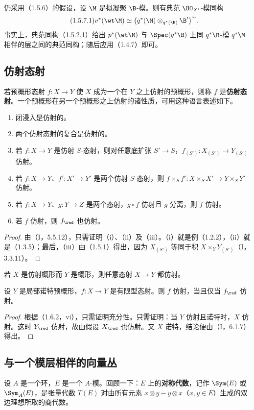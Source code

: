 仍采用（1.5.6）的假设，设 $\M$ 是拟凝聚 $\B$-模。则有典范 $\OO_{X'}$-模同构
\begin{equation}\tag{1.5.7.1}
v^*(\wt\M)\simeq\bigl(q^*(\M)\otimes_{q^*(\B)}\B'\bigr)^\sim.
\end{equation}
事实上，典范同构（1.5.2.1）给出 $p^*(\wt\M)$ 与 $\Spec(q^*\B)$ 上同 $q^*\B$-模 $q^*\M$ 相伴的层之间的典范同构；随后应用（1.4.7）即可。

\subsection{仿射态射}
若预概形态射 $f:X\to Y$ 使 $X$ 成为一个在 $Y$ 之上仿射的预概形，则称 $f$ 是\textbf{仿射态射}。一个预概形在另一个预概形之上仿射的诸性质，可用这种语言表述如下。

\begin{enumerate}[label=(\roman*)]
\item 闭浸入是仿射的。
\item 两个仿射态射的复合是仿射的。
\item 若 $f:X\to Y$ 是仿射 $S$-态射，则对任意底扩张 $S'\to S$，$f_{(S')}:X_{(S')}\to Y_{(S')}$ 仿射。
\item 若 $f:X\to Y$、$f':X'\to Y'$ 是两个仿射 $S$-态射，则
$f\times_Sf':X\times_SX'\to Y\times_SY'$ 仿射。
\item 若 $f:X\to Y$、$g:Y\to Z$ 是两个态射，$g\circ f$ 仿射且 $g$ 分离，则 $f$ 仿射。
\item 若 $f$ 仿射，则 $f_{\red}$ 也仿射。
\end{enumerate}
\begin{proof}
由（I，5.5.12），只需证明（i）、（ii）及（iii）。（i）就是例（1.2.2），（ii）就是（1.3.5）；最后，（iii）由（1.5.1）得出，因为 $X_{(S')}$ 等同于积 $X\times_YY_{(S')}$（I，3.3.11）。
\end{proof}

若 $X$ 是仿射概形而 $Y$ 是概形，则任意态射 $X\to Y$ 都仿射。

设 $Y$ 是局部诺特预概形，$f:X\to Y$ 是有限型态射。则 $f$ 仿射，当且仅当 $f_{\red}$ 仿射。
\begin{proof}
根据（1.6.2，vi），只需证明充分性。只需证明：当 $Y$ 仿射且诺特时，$X$ 仿射。这时 $Y_{\red}$ 仿射，故由假设 $X_{\red}$ 也仿射。又 $X$ 诺特，结论便由（I，6.1.7）得出。
\end{proof}

\subsection{与一个模层相伴的向量丛}
设 $A$ 是一个环，$E$ 是一个 $A$-模。回顾一下：$E$ 上的\textbf{对称代数}，记作 $\Sym(E)$ 或 $\Sym_A(E)$，是张量代数 $T(E)$ 对由所有元素 $x\otimes y-y\otimes x$（$x,y\in E$）生成的双边理想所取的商代数。

